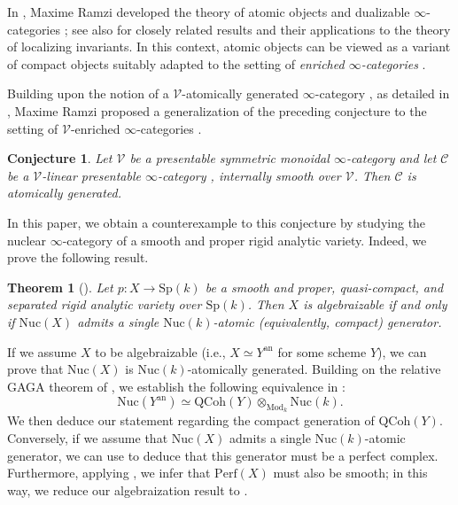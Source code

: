 \documentclass[oneside, hidelinks, 12pt, a4paper,reqno]{amsart}
\theoremstyle{plain}
\newtheorem{theorem}{Theorem}[section]
\newtheorem{conjecture}[conjecture]{Conjecture}
\theoremstyle{definition}
\theoremstyle{plain}
\newcommand{\Sp}{\mathrm{Sp}}
\newcommand{\Spk}{\mathrm{Sp}(k)}
\newcommand{\Perf}{\mathrm{Perf}}
\newcommand{\cat}{$\infty$-category }
\newcommand{\cates}{$\infty$-categories }
\newcommand{\Nuc}{\mathrm{Nuc}}
\newcommand{\Qcoh}{\mathrm{QCoh}}
\newcommand{\Mod}{\mathrm{Mod}}
\begin{document}
In \cite{ramzi2024dualizablepresentableinftycategories, ramzi2024locallyrigidinftycategories}, Maxime Ramzi developed the theory of atomic objects and dualizable \cates; see also \cite{efimov2024k, efimov2025localizing} for closely related results and their applications to the theory of localizing invariants. In this context, atomic objects can be viewed as a variant of compact objects suitably adapted to the setting of \emph{enriched \cates}.

Building upon the notion of a $\mathscr{V}$-atomically generated \cat, as detailed in , Maxime Ramzi proposed a generalization of the preceding conjecture to the setting of $\mathscr{V}$-enriched \cates.

\begin{conjecture}\label{conj: congettura setting enriched}
    Let $\mathscr{V}$ be a presentable symmetric monoidal \cat and let $\mathscr{C}$ be a $\mathscr{V}$-linear presentable \cat, internally smooth over $\mathscr{V}$. Then $\mathscr{C}$ is atomically generated.
\end{conjecture}

In this paper, we obtain a counterexample to this conjecture by studying the nuclear $\infty$-category of a smooth and proper rigid analytic variety. Indeed, we prove the following result.

\begin{theorem}[{}]\label{thm: main theorem intro}
Let $p\colon X \to \Sp(k)$ be a smooth and proper, quasi-compact, and separated rigid analytic variety over $\Spk$. Then $X$ is algebraizable if and only if $\Nuc(X)$ admits a single $\Nuc(k)$-atomic (equivalently, compact) generator.
\end{theorem}

If we assume $X$ to be algebraizable (i.e., $X \simeq Y^{\mathrm{an}}$ for some scheme $Y$), we can prove that $\Nuc(X)$ is $\Nuc(k)$-atomically generated. Building on the relative GAGA theorem of \cite{wang2026relativegagatheoremapplication}, we establish the following equivalence in : 
\[
\Nuc(Y^{\mathrm{an}}) \simeq \Qcoh(Y) \otimes_{\Mod_k}\Nuc(k).
\]
We then deduce our statement regarding the compact generation of $\Qcoh(Y)$. Conversely, if we assume that $\Nuc(X)$ admits a single $\Nuc(k)$-atomic generator, we can use  to deduce that this generator must be a perfect complex. Furthermore, applying , we infer that $\Perf(X)$ must also be smooth; in this way, we reduce our algebraization result to . 
\end{document}
